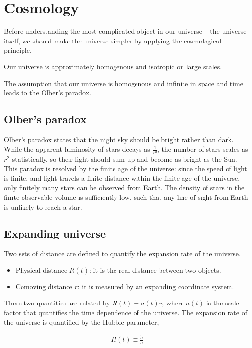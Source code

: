\documentclass[12pt]{book} %
\numberwithin{equation}{chapter}
\begin{document}
\newpage
{} %
\chapter{Cosmology}
Before understanding the most complicated object in our universe -- the universe itself, we should make the universe simpler by applying the cosmological principle.
\begin{theorem}
Our universe is approximately homogenous and isotropic on large scales.
\end{theorem}
The assumption that our universe is homogenous and infinite in space and time leads to the Olber's paradox.

\section{Olber's paradox}
Olber's paradox states that the night sky should be bright rather than dark. While the apparent luminosity of stars decays as $\frac{1}{r^2}$, the number of stars scales as $r^2$ statistically, so their light should sum up and become as bright as the Sun.\bigskip\newline
This paradox is resolved by the finite age of the universe: since the speed of light is finite, and light travels a finite distance within the finite age of the universe, only finitely many stars can be observed from Earth. The density of stars in the finite observable volume is sufficiently low, such that any line of sight from Earth is unlikely to reach a star.

\section{Expanding universe}
Two sets of distance are defined to quantify the expansion rate of the universe.
\begin{itembox}
\begin{itemize}
\item Physical distance $R(t)$: it is the real distance between two objects.
\item Comoving distance $r$: it is measured by an expanding coordinate system.
\end{itemize}
\end{itembox}
These two quantities are related by $R(t)=a(t)r$, where $a(t)$ is the scale factor that quantifies the time dependence of the universe.\bigskip\newline
The expansion rate of the universe is quantified by the Hubble parameter,
\begin{eqnbox}
\begin{align}
H(t)\equiv\frac{\dot{a}}{a}
\end{align}
\end{eqnbox}
\end{document}
